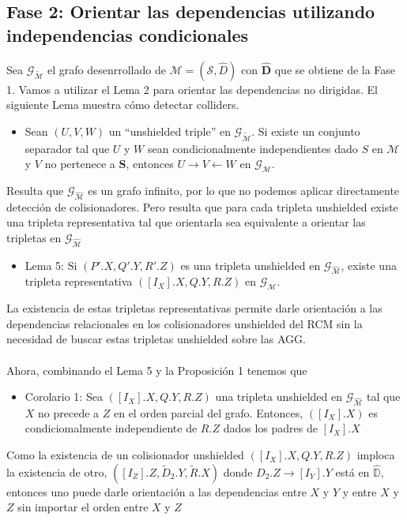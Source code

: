 \documentclass[11pt]{article}
\theoremstyle{plain}
\begin{document}
\subsection{Fase 2: Orientar las dependencias utilizando independencias condicionales}
Sea $\mathcal{G}_{\tilde{\mathcal{M}}}$ el grafo desenrrollado de $\mathcal{M}=(\mathcal{S},\hat{D})$ con $\hat{\mathbf{D}}$ que se obtiene de la Fase 1. Vamos a utilizar el Lema 2 para orientar las dependencias no dirigidas. El siguiente Lema muestra cómo detectar colliders.
\begin{itemize}
\item Sean $(U,V,W)$ un “unshielded triple” en $\mathcal{G}_{\tilde{\mathcal{M}}}$. Si existe un conjunto separador tal que $U$ y $W$ sean condicionalmente independientes dado $S$ en $\mathcal{M}$ y $V$ no pertenece a $\mathbf{S}$, entonces $U \to V \leftarrow W$ en $\mathcal{G}_\mathcal{M}$.
\end{itemize}
Resulta que $\mathcal{G}_\mathcal{\hat{M}}$ es un grafo infinito, por lo que no podemos aplicar directamente detección de colisionadores. Pero resulta que para cada tripleta unshielded existe una tripleta representativa tal que orientarla sea equivalente a orientar las tripletas en $\mathcal{G}_\mathcal{\hat{M}}$
\begin{itemize}
\item Lema 5: Si $(P'.X,Q'.Y,R'.Z)$ es una tripleta unshielded en $\mathcal{G}_\mathcal{\hat{M}}$, existe una tripleta representativa $([I_X].X,Q.Y,R.Z)$ en $\mathcal{G}_\mathcal{M}$.
\end{itemize}
La existencia de estas tripletas representativas permite darle orientación a las dependencias relacionales en los colisionadores unshielded del RCM sin la necesidad de buscar estas tripletas unshielded sobre las AGG.\\
\\
Ahora, combinando el Lema 5 y la Proposición 1 tenemos que
\begin{itemize}
\item Corolario 1: Sea $([I_X].X, Q.Y,R.Z)$ una tripleta unshielded en $\mathcal{G}_\mathcal{\hat{M}}$ tal que $X$ no precede a $Z$ en el orden parcial del grafo. Entonces, $([I_X].X)$ es condiciomalmente independiente de $R.Z$ dados los padres de $[I_X].X$
\end{itemize}
Como la existencia de un colisionador unshielded $([I_X].X, Q.Y,R.Z)$ imploca la existencia de otro, $([I_Z].Z,\tilde{D}_2.Y,\tilde{R}.X)$ donde $D_2.Z \to [I_Y].Y$ está en $\mathbb{\hat{D}}$, entonces uno puede darle orientación a las dependencias entre $X$ y $Y$ y entre $X$ y $Z$ sin importar el orden entre $X$ y $Z$
\end{document}

